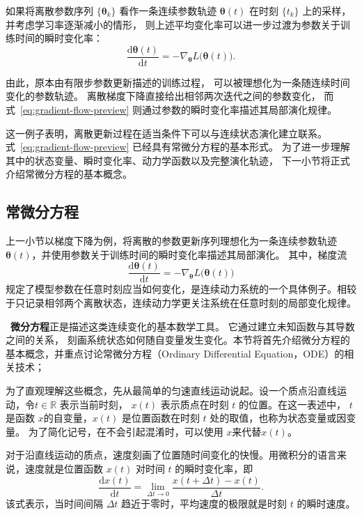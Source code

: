 \documentclass[UTF8,a4paper,zihao=-4,oneside,openany]{ctexbook}
\begin{document}
如果将离散参数序列
\(\{\boldsymbol{\theta}_k\}\)
看作一条连续参数轨迹
\(\boldsymbol{\theta}(t)\)
在时刻 \(\{t_k\}\) 上的采样，并考虑学习率逐渐减小的情形，
则上述平均变化率可以进一步过渡为参数关于训练时间的瞬时变化率：
\begin{equation}
    \frac{
        \mathrm{d}\boldsymbol{\theta}(t)
    }{
        \mathrm{d}t
    }
    =
    -
    \nabla_{\boldsymbol{\theta}}
    L\bigl(\boldsymbol{\theta}(t)\bigr).
    \label{eq:gradient-flow-preview}
\end{equation}

由此，原本由有限步参数更新描述的训练过程，
可以被理想化为一条随连续时间变化的参数轨迹。
离散梯度下降直接给出相邻两次迭代之间的参数变化，
而式~\eqref{eq:gradient-flow-preview}
则通过参数的瞬时变化率描述其局部演化规律。

这一例子表明，离散更新过程在适当条件下可以与连续状态演化建立联系。
式~\eqref{eq:gradient-flow-preview}
已经具有常微分方程的基本形式。
为了进一步理解其中的状态变量、瞬时变化率、动力学函数以及完整演化轨迹，
下一小节将正式介绍常微分方程的基本概念。



\subsection{常微分方程}
上一小节以梯度下降为例，将离散的参数更新序列理想化为一条连续参数轨迹
\(\boldsymbol{\theta}(t)\)，并使用参数关于训练时间的瞬时变化率描述其局部演化。
其中，梯度流
\begin{equation}
    \frac{\mathrm{d}\boldsymbol{\theta}(t)}{\mathrm{d}t}
    =
    -
    \nabla_{\boldsymbol{\theta}}
    L\bigl(\boldsymbol{\theta}(t)\bigr)
\end{equation}
规定了模型参数在任意时刻应当如何变化，是连续动力系统的一个具体例子。相较于只记录相邻两个离散状态，连续动力学更关注系统在任意时刻的局部变化规律。

~\textbf{微分方程}正是描述这类连续变化的基本数学工具。
它通过建立未知函数与其导数之间的关系，
刻画系统状态如何随自变量发生变化。本节将首先介绍微分方程的基本概念，并重点讨论常微分方程（Ordinary Differential Equation，ODE）的相关技术；

为了直观理解这些概念，先从最简单的匀速直线运动说起。设一个质点沿直线运动，令\(t \in \mathbb{R}\) 表示当前时刻， \(x(t)\) 表示质点在时刻 \(t\) 的位置。在这一表述中， \(t\) 是函数 \(x\)的自变量，\(x(t)\) 是位置函数在时刻 \(t\) 处的取值，也称为状态变量或因变量。 为了简化记号，在不会引起混淆时，可以使用 \(x\)来代替\(x(t)\)。

对于沿直线运动的质点，速度刻画了位置随时间变化的快慢。用微积分的语言来说，速度就是位置函数 \(x(t)\) 对时间 \(t\) 的瞬时变化率，即
\begin{equation}
\frac{\mathrm{d}x(t)}{\mathrm{d}t}
=
\lim_{\Delta t \to 0}
\frac{x(t+\Delta t)-x(t)}{\Delta t}.
\end{equation}
该式表示，当时间间隔 \(\Delta t\) 趋近于零时，平均速度的极限就是时刻 \(t\) 的瞬时速度。
\end{document}
